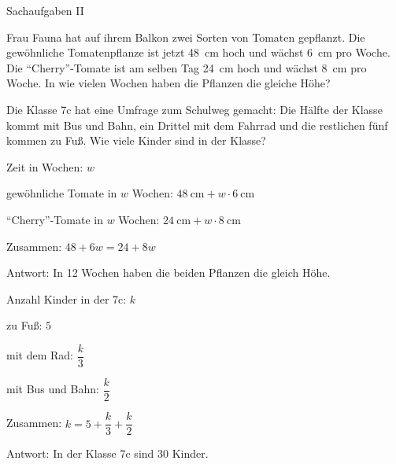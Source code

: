 \documentclass[12pt,a5paper,landscape]{scrartcl}
\begin{document}
\begin{karte2}{Sachaufgaben II}
	\begin{enumeratea}
		\item Frau Fauna hat auf ihrem Balkon zwei Sorten von Tomaten gepflanzt. Die gewöhnliche Tomatenpflanze ist jetzt \SI{48}{\centi\meter} hoch und wächst \SI{6}{\centi\meter} pro Woche. Die \enquote{Cherry}-Tomate ist am selben Tag \SI{24}{\centi\meter} hoch und wächst \SI{8}{\centi\meter} pro Woche. In wie vielen Wochen haben die Pflanzen die gleiche Höhe?
		\item Die Klasse 7c hat eine Umfrage zum Schulweg gemacht: Die Hälfte der Klasse kommt mit Bus und Bahn, ein Drittel mit dem Fahrrad und die restlichen fünf kommen zu Fuß. Wie viele Kinder sind in der Klasse?
	\end{enumeratea}
\end{karte2}

\begin{loesungskarte}
	\begin{enumeratea}
		\item 
		\begin{smallitemize}
			\item Zeit in Wochen: $w$
			\item gewöhnliche Tomate in $w$ Wochen: $\SI{48}{\centi\meter} + w\cdot \SI{6}{\centi\meter}$
			\item \enquote{Cherry}-Tomate in $w$ Wochen: $\SI{24}{\centi\meter} + w\cdot \SI{8}{\centi\meter}$
			\item Zusammen: $48 + 6w = 24 + 8w$
		\end{smallitemize}
		
		Antwort: In 12 Wochen haben die beiden Pflanzen die gleich Höhe.
		
		\item
		\begin{smallitemize}
			\item Anzahl Kinder in der 7c: $k$
			\item zu Fuß: $5$
			\item mit dem Rad: $\dfrac{k}{3}$
			\item mit Bus und Bahn: $\dfrac{k}{2}$
			\item Zusammen: $k = 5 + \dfrac{k}{3} + \dfrac{k}{2}$
		\end{smallitemize}
		
		Antwort: In der Klasse 7c sind 30 Kinder.
	\end{enumeratea}
\end{loesungskarte}
\end{document}
